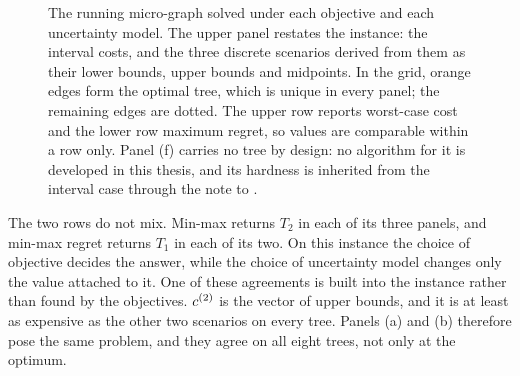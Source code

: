 \begin{figure}[htbp]
\caption{The running micro-graph solved under each objective and each uncertainty model. The upper panel restates the instance: the interval costs, and the three discrete scenarios derived from them as their lower bounds, upper bounds and midpoints. In the grid, orange edges form the optimal tree, which is unique in every panel; the remaining edges are dotted. The upper row reports worst-case cost and the lower row maximum regret, so values are comparable within a row only. Panel (f) carries no tree by design: no algorithm for it is developed in this thesis, and its hardness is inherited from the interval case through the note to .}
\label{fig:micro-graph-gallery}
\end{figure}

The two rows do not mix.
Min-max returns $T_2$ in each of its three panels, and min-max regret returns $T_1$ in each of its two.
On this instance the choice of objective decides the answer, while the choice of uncertainty model changes only the value attached to it.
One of these agreements is built into the instance rather than found by the objectives.
$c^{(2)}$ is the vector of upper bounds, and it is at least as expensive as the other two scenarios on every tree.
Panels (a) and (b) therefore pose the same problem, and they agree on all eight trees, not only at the optimum.

